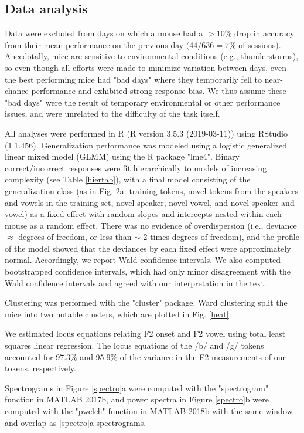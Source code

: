 \subsection{Data analysis}
Data were excluded from days on which a mouse had a $>10\%$ drop in accuracy from their mean performance on the previous day $(44/636 = 7\%$ of sessions$)$. Anecdotally, mice are sensitive to environmental conditions (e.g., thunderstorms), so even though all efforts were made to minimize variation between days, even the best performing mice had "bad days" where they temporarily fell to near-chance performance and exhibited strong response bias. We thus assume these "bad days" were the result of temporary environmental or other performance issues, and were unrelated to the difficulty of the task itself. 

All analyses were performed in R (R version 3.5.3 (2019-03-11))\citep{Team2016} using RStudio (1.1.456)\citep{Team2015}. Generalization performance was modeled using a logistic generalized linear mixed model (GLMM) using the R package "lme4"\citep{Bates2015}. Binary correct/incorrect responses were fit hierarchically to models of increasing complexity (see Table \ref{hiertab}), with a final model consisting of the generalization class (as in Fig. 2a: training tokens, novel tokens from the speakers and vowels in the training set, novel speaker, novel vowel, and novel speaker and vowel) as a fixed effect with random slopes and intercepts nested within each mouse as a random effect. There was no evidence of overdispersion (i.e., deviance $\approx$ degrees of freedom, or less than  $\sim$ 2 times degrees of freedom), and the profile of the model showed that the deviances by each fixed effect were approximately normal. Accordingly, we report Wald confidence intervals. We also computed bootstrapped confidence intervals, which had only minor disagreement with the Wald confidence intervals and agreed with our interpretation in the text.

Clustering was performed with the "cluster"\citep{Maechler2017} package. Ward clustering split the mice into two notable clusters, which are plotted in Fig. \ref{heat}.

We estimated locus equations relating F2 onset and F2 vowel using total least squares linear regression. The locus equations of the /b/ and /g/ tokens accounted for 97.3\% and 95.9\% of the variance in the F2 measurements of our tokens, respectively.

Spectrograms in Figure \ref{spectro}a were computed with the "spectrogram" function in MATLAB 2017b, and power spectra in Figure \ref{spectro}b were computed with the "pwelch" function in MATLAB 2018b with the same window and overlap as \ref{spectro}a spectrograms.


